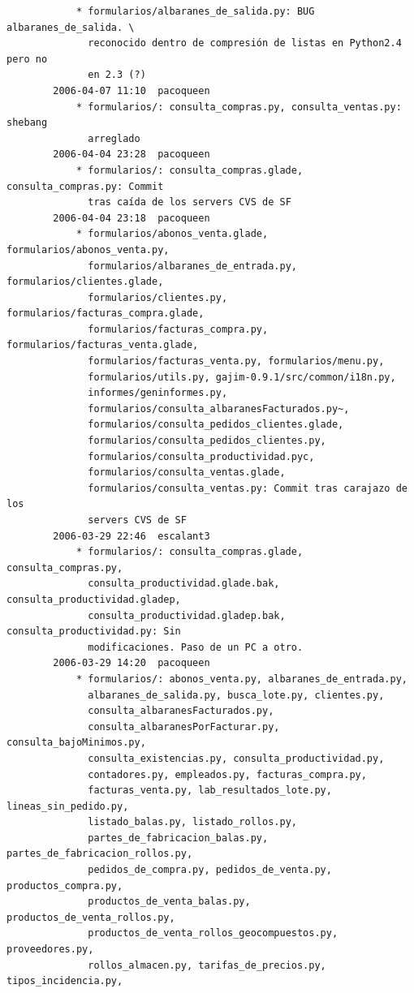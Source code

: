 \documentclass[a4paper]{article}
\begin{document}
\begin{verbatim}
            * formularios/albaranes_de_salida.py: BUG albaranes_de_salida. \
              reconocido dentro de compresión de listas en Python2.4 pero no
              en 2.3 (?)
        2006-04-07 11:10  pacoqueen
            * formularios/: consulta_compras.py, consulta_ventas.py: shebang
              arreglado
        2006-04-04 23:28  pacoqueen
            * formularios/: consulta_compras.glade, consulta_compras.py: Commit
              tras caída de los servers CVS de SF
        2006-04-04 23:18  pacoqueen
            * formularios/abonos_venta.glade, formularios/abonos_venta.py,
              formularios/albaranes_de_entrada.py, formularios/clientes.glade,
              formularios/clientes.py, formularios/facturas_compra.glade,
              formularios/facturas_compra.py, formularios/facturas_venta.glade,
              formularios/facturas_venta.py, formularios/menu.py,
              formularios/utils.py, gajim-0.9.1/src/common/i18n.py,
              informes/geninformes.py,
              formularios/consulta_albaranesFacturados.py~,
              formularios/consulta_pedidos_clientes.glade,
              formularios/consulta_pedidos_clientes.py,
              formularios/consulta_productividad.pyc,
              formularios/consulta_ventas.glade,
              formularios/consulta_ventas.py: Commit tras carajazo de los
              servers CVS de SF
        2006-03-29 22:46  escalant3
            * formularios/: consulta_compras.glade, consulta_compras.py,
              consulta_productividad.glade.bak, consulta_productividad.gladep,
              consulta_productividad.gladep.bak, consulta_productividad.py: Sin
              modificaciones. Paso de un PC a otro.
        2006-03-29 14:20  pacoqueen
            * formularios/: abonos_venta.py, albaranes_de_entrada.py,
              albaranes_de_salida.py, busca_lote.py, clientes.py,
              consulta_albaranesFacturados.py,
              consulta_albaranesPorFacturar.py, consulta_bajoMinimos.py,
              consulta_existencias.py, consulta_productividad.py,
              contadores.py, empleados.py, facturas_compra.py,
              facturas_venta.py, lab_resultados_lote.py, lineas_sin_pedido.py,
              listado_balas.py, listado_rollos.py,
              partes_de_fabricacion_balas.py, partes_de_fabricacion_rollos.py,
              pedidos_de_compra.py, pedidos_de_venta.py, productos_compra.py,
              productos_de_venta_balas.py, productos_de_venta_rollos.py,
              productos_de_venta_rollos_geocompuestos.py, proveedores.py,
              rollos_almacen.py, tarifas_de_precios.py, tipos_incidencia.py,

\end{verbatim}
\end{document}

